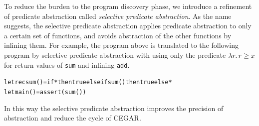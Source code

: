 \begin{enumerate}
      To reduce the burden to the program discovery phase, we introduce
      a refinement of predicate abstraction called \emph{selective
      predicate abstraction}.  As the name suggests, the selective
      predicate abstraction applies predicate abstraction to only a
      certain set of functions, and avoids abstraction of the other
      functions by inlining them.  For example, the program above is
      translated to the following program by selective predicate
      abstraction with using only the predicate $\lambda{r}.\,{r \geq x}$ for
      return values of \texttt{sum} and inlining \texttt{add}.
\begin{alltt}
let rec sum () = if * then true else if sum () then true else *
let main () = assert (sum ())
\end{alltt}
      In this way the selective predicate abstraction improves the
      precision of abstraction and reduce the cycle of CEGAR.


\end{enumerate}
